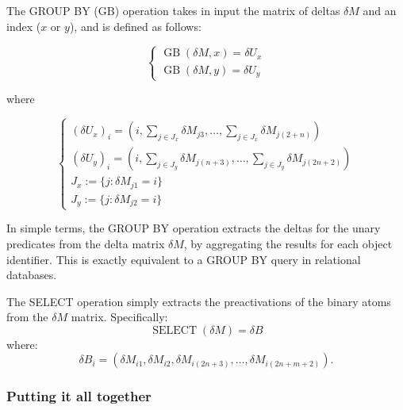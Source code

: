 \begin{definition}[GROUP BY]
	The GROUP BY ($\text{GB}$) operation takes in input the matrix of deltas $\delta M$ and an index ($x$ or $y$), and is defined as follows:
	
	\begin{equation*}
	\begin{cases}
	\operatorname{GB}(\delta M, x)= \delta U_x\\
	\operatorname{GB}(\delta M, y)= \delta U_y
	\end{cases}
	\end{equation*}
		
	where 
	
	\begin{equation}
	\begin{cases}
	\left(\delta U_x \right)_i = \left(i, \sum_{j\in J_x}\delta M_{j3},\dots, \sum_{j \in J_x}\delta M_{j(2+n)}\right)\\
	\left(\delta U_y \right)_i = \left(i, \sum_{j\in J_y}\delta M_{j(n+3)},\dots, \sum_{j \in J_y}\delta M_{j(2n+2)}\right)\\
	J_x:=\{j:\delta M_{j1}=i\}\\
	J_y:=\{j:\delta M_{j2}=i\}
	\end{cases}
	\end{equation}
\end{definition}

In simple terms, the GROUP BY operation extracts the deltas for the unary predicates from the delta matrix $\delta M$, by aggregating the results for each object identifier. This is exactly equivalent to a GROUP BY query in relational databases.

\begin{definition}[SELECT]
The SELECT operation simply extracts the preactivations of the binary atoms from the $\delta M$ matrix. Specifically:
$$\operatorname{SELECT}(\delta M) = \delta B $$
where:
$$\delta B_i = \left(\delta M_{i1}, \delta M_{i2}, \delta M_{i(2n+3)},\dots, \delta M_{i(2n+m+2)}\right).$$
\end{definition}

\subsubsection{Putting it all together} %

